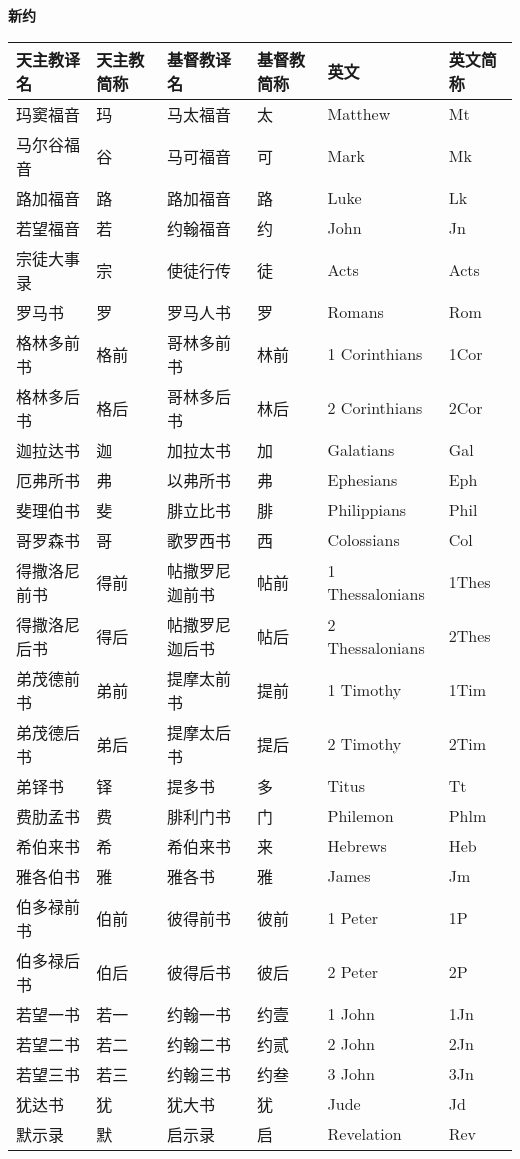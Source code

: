 \begin{center}
	\textbf{新约}
\end{center}

\begin{longtable}{|l|l|l|l|l|l|}
	\hline 
	\textbf{天主教译名} & \textbf{天主教简称} & \textbf{基督教译名} & \textbf{基督教简称} & \textbf{英文} & \textbf{英文简称} \\ 
	\hline 
	玛窦福音 & 玛 & 马太福音 & 太 & Matthew & Mt \\
	\hline
	马尔谷福音 & 谷 & 马可福音 & 可 & Mark & Mk \\
	\hline
	路加福音 & 路 & 路加福音 & 路 & Luke & Lk \\
	\hline
	若望福音 & 若 & 约翰福音 & 约 & John & Jn \\
	\hline
	宗徒大事录 & 宗 & 使徒行传 & 徒 & Acts & Acts \\
	\hline
	罗马书 & 罗 & 罗马人书 & 罗 & Romans & Rom \\
	\hline
	格林多前书 & 格前 & 哥林多前书 & 林前 & 1 Corinthians & 1Cor \\
	\hline
	格林多后书 & 格后 & 哥林多后书 & 林后 & 2 Corinthians & 2Cor \\
	\hline
	迦拉达书 & 迦 & 加拉太书 & 加 & Galatians & Gal \\
	\hline
	厄弗所书 & 弗 & 以弗所书 & 弗 & Ephesians & Eph \\
	\hline
	斐理伯书 & 斐 & 腓立比书 & 腓 & Philippians & Phil \\
	\hline
	哥罗森书 & 哥 & 歌罗西书 & 西 & Colossians & Col \\
	\hline
	得撒洛尼前书 & 得前 & 帖撒罗尼迦前书 & 帖前 & 1 Thessalonians & 1Thes \\
	\hline
	得撒洛尼后书 & 得后 & 帖撒罗尼迦后书 & 帖后 & 2 Thessalonians & 2Thes \\
	\hline
	弟茂德前书 & 弟前 & 提摩太前书 & 提前 & 1 Timothy & 1Tim \\
	\hline
	弟茂德后书 & 弟后 & 提摩太后书 & 提后 & 2 Timothy & 2Tim \\
	\hline
	弟铎书 & 铎 & 提多书 & 多 & Titus & Tt \\
	\hline
	费肋孟书 & 费 & 腓利门书 & 门 & Philemon & Phlm \\
	\hline
	希伯来书 & 希 & 希伯来书 & 来 & Hebrews & Heb \\
	\hline
	雅各伯书 & 雅 & 雅各书 & 雅 & James & Jm \\
	\hline
	伯多禄前书 & 伯前 & 彼得前书 & 彼前 & 1 Peter & 1P \\
	\hline
	伯多禄后书 & 伯后 & 彼得后书 & 彼后 & 2 Peter & 2P \\
	\hline
	若望一书 & 若一 & 约翰一书 & 约壹 & 1 John & 1Jn \\
	\hline
	若望二书 & 若二 & 约翰二书 & 约贰 & 2 John & 2Jn \\
	\hline
	若望三书 & 若三 & 约翰三书 & 约叁 & 3 John & 3Jn \\
	\hline
	犹达书 & 犹 & 犹大书 & 犹 & Jude & Jd \\
	\hline
	默示录 & 默 & 启示录 & 启 & Revelation & Rev \\
	\hline
\end{longtable}